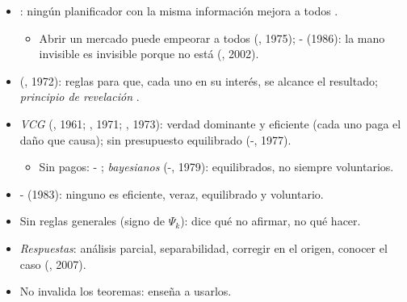\documentclass{article}
\begin{document}
\begin{columnas}
\begin{itemize}
\item {}: ningún planificador con la misma información mejora a todos .
  \begin{itemize}
  \item Abrir un mercado puede empeorar a todos (, 1975); - (1986): la mano invisible es invisible porque no está (, 2002).
  \end{itemize}
\item {} (, 1972): reglas para que, cada uno en su interés, se alcance el resultado; \emph{principio de revelación} .
\item \emph{VCG} (, 1961; , 1971; , 1973): verdad dominante y eficiente (cada uno paga el daño que causa); sin presupuesto equilibrado (-, 1977).
  \begin{itemize}
  \item Sin pagos: - ; \emph{bayesianos} (-, 1979): equilibrados, no siempre voluntarios.
  \end{itemize}
\item {}- (1983): ninguno es eficiente, veraz, equilibrado y voluntario.
\end{itemize}

\begin{itemize}
\item Sin reglas generales (signo de $\Psi_k$): dice qué no afirmar, no qué hacer.
\item \emph{Respuestas}: análisis parcial, separabilidad, corregir en el origen, conocer el caso (, 2007).
\item No invalida los teoremas: enseña a usarlos.
\end{itemize}


\end{columnas}
\end{document}
